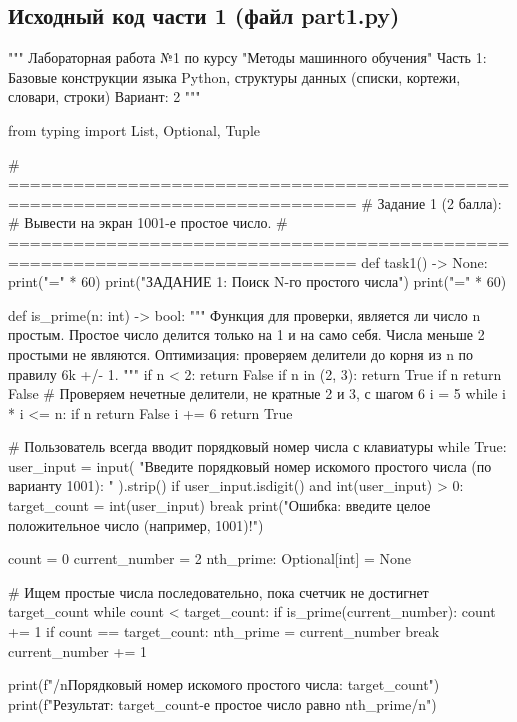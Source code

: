 \documentclass[14pt,a4paper]{extarticle}
\begin{document}
\subsection{Исходный код части 1 (файл part1.py)}
\begin{CodeListing}
"""
Лабораторная работа №1 по курсу "Методы машинного обучения"
Часть 1: Базовые конструкции языка Python, структуры данных (списки, кортежи, словари, строки)
Вариант: 2
"""

from typing import List, Optional, Tuple


# ==============================================================================
# Задание 1 (2 балла):
# Вывести на экран 1001-е простое число.
# ==============================================================================
def task1() -> None:
    print("=" * 60)
    print("ЗАДАНИЕ 1: Поиск N-го простого числа")
    print("=" * 60)

    def is_prime(n: int) -> bool:
        """
        Функция для проверки, является ли число n простым.
        Простое число делится только на 1 и на само себя.
        Числа меньше 2 простыми не являются.
        Оптимизация: проверяем делители до корня из n по правилу 6k +/- 1.
        """
        if n < 2:
            return False
        if n in (2, 3):
            return True
        if n %
            return False
        # Проверяем нечетные делители, не кратные 2 и 3, с шагом 6
        i = 5
        while i * i <= n:
            if n %
                return False
            i += 6
        return True

    # Пользователь всегда вводит порядковый номер числа с клавиатуры
    while True:
        user_input = input(
            "Введите порядковый номер искомого простого числа (по варианту 1001): "
        ).strip()
        if user_input.isdigit() and int(user_input) > 0:
            target_count = int(user_input)
            break
        print("Ошибка: введите целое положительное число (например, 1001)!")

    count = 0
    current_number = 2
    nth_prime: Optional[int] = None

    # Ищем простые числа последовательно, пока счетчик не достигнет target_count
    while count < target_count:
        if is_prime(current_number):
            count += 1
            if count == target_count:
                nth_prime = current_number
                break
        current_number += 1

    print(f"/nПорядковый номер искомого простого числа: {target_count}")
    print(f"Результат: {target_count}-е простое число равно {nth_prime}/n")



\end{CodeListing}
\end{document}
